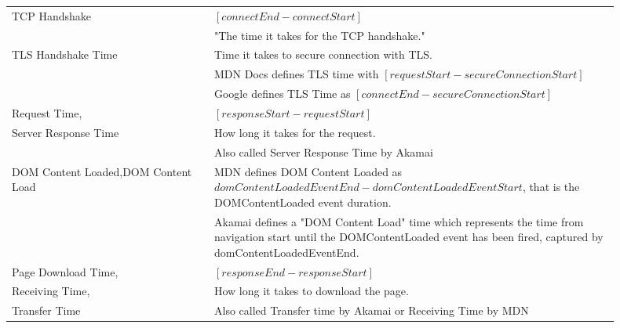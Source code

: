 \begin{center}
\begin{longtable}{ | p{0.3\linewidth} | p{0.6\linewidth} | }
	\hline
	TCP Handshake %
	& $[connectEnd - connectStart]$ \\
	& "The time it takes for the TCP handshake." \\ %

	\hline
	TLS Handshake Time
	& Time it takes to secure connection with TLS.  \\
	& MDN Docs defines TLS time with $[requestStart - secureConnectionStart]$ \\
	& Google defines TLS Time as $[connectEnd - secureConnectionStart]$ \\ %

	\hline
	Request Time, 
	& $[responseStart - requestStart]$ \\ 
	Server Response Time & How long it takes for the request. \\ %
	& Also called Server Response Time by Akamai \\ %
	
	\hline
	DOM Content Loaded,DOM Content Load
	& MDN defines DOM Content Loaded as $domContentLoadedEventEnd - domContentLoadedEventStart$, that is the DOMContentLoaded event duration. \\
	& Akamai defines a "DOM Content Load" time which represents the time from navigation start until the DOMContentLoaded event has been fired, captured by domContentLoadedEventEnd. \\

	\hline
	Page Download Time,
	& $[responseEnd - responseStart]$ \\
	Receiving Time,  & How long it takes to download the page. \\
	Transfer Time & Also called Transfer time by Akamai or Receiving Time by MDN \\


\end{longtable}
\end{center}
